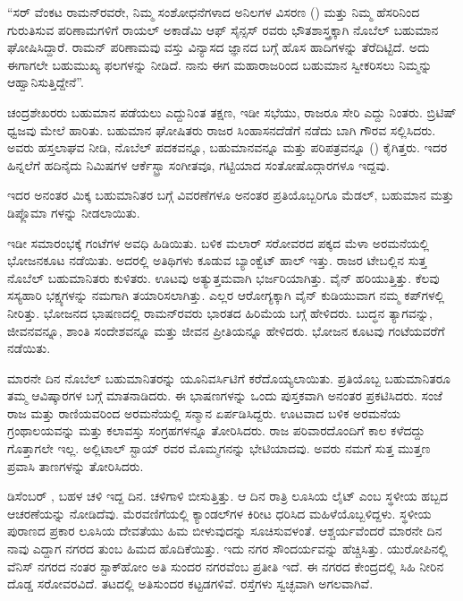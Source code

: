 “ಸರ್ ವೆಂಕಟ ರಾಮನ್‍ರವರೇ, ನಿಮ್ಮ ಸಂಶೋಧನೆಗಳಾದ ಅನಿಲಗಳ ವಿಸರಣ () ಮತ್ತು ನಿಮ್ಮ ಹೆಸರಿನಿಂದ ಗುರುತಿಸುವ ಪರಿಣಾಮಗಳಿಗೆ ರಾಯಲ್ ಅಕಾಡೆಮಿ ಆಫ್ ಸೈನ್ಸಸ್ ರವರು ಭೌತಶಾಸ್ತ್ರಕ್ಕಾಗಿ ನೊಬೆಲ್ ಬಹುಮಾನ ಘೋಷಿಸಿದ್ದಾರೆ. ರಾಮನ್ ಪರಿಣಾಮವು ವಸ್ತು ವಿನ್ಯಾಸದ ಜ್ಞಾನದ ಬಗ್ಗೆ ಹೊಸ ಹಾದಿಗಳನ್ನು ತೆರೆದಿಟ್ಟಿದೆ. ಅದು ಈಗಾಗಲೇ ಬಹುಮುಖ್ಯ ಫಲಗಳನ್ನು ನೀಡಿದೆ. ನಾನು ಈಗ ಮಹಾರಾಜರಿಂದ ಬಹುಮಾನ ಸ್ವೀಕರಿಸಲು ನಿಮ್ಮನ್ನು ಆಹ್ವಾನಿಸುತ್ತಿದ್ದೇನೆ”.

ಚಂದ್ರಶೇಖರರು ಬಹುಮಾನ ಪಡೆಯಲು ಎದ್ದುನಿಂತ ತಕ್ಷಣ, ಇಡೀ ಸಭೆಯು, ರಾಜರೂ ಸೇರಿ ಎದ್ದು ನಿಂತರು. ಬ್ರಿಟಿಷ್ ಧ್ವಜವು ಮೇಲೆ ಹಾರಿತು. ಬಹುಮಾನ ಘೋಷಿತರು ರಾಜರ ಸಿಂಹಾಸನದೆಡೆಗೆ ನಡೆದು ಬಾಗಿ ಗೌರವ ಸಲ್ಲಿಸಿದರು. ಅವರು ಹಸ್ತಲಾಘವ ನೀಡಿ, ನೊಬೆಲ್ ಪದಕವನ್ನೂ, ಬಹುಮಾನವನ್ನೂ ಮತ್ತು ಪರಿಪತ್ರವನ್ನೂ () ಕೈಗಿತ್ತರು. ಇದರ ಹಿನ್ನಲೆಗೆ ಹದಿನೈದು ನಿಮಿಷಗಳ ಆರ್ಕೆಸ್ಟ್ರಾ ಸಂಗೀತವೂ, ಗಟ್ಟಿಯಾದ ಸಂತೋಷೊದ್ಗಾರಗಳೂ ಇದ್ದವು.

ಇದರ ಅನಂತರ ಮಿಕ್ಕ ಬಹುಮಾನಿತರ ಬಗ್ಗೆ ವಿವರಣೆಗಳೂ ಅನಂತರ ಪ್ರತಿಯೊಬ್ಬರಿಗೂ ಮೆಡಲ್, ಬಹುಮಾನ ಮತ್ತು ಡಿಪ್ಲೊಮಾ ಗಳನ್ನು ನೀಡಲಾಯಿತು.

ಇಡೀ ಸಮಾರಂಭಕ್ಕೆ  ಗಂಟೆಗಳ ಅವಧಿ ಹಿಡಿಯಿತು. ಬಳಿಕ ಮಲಾರ್ ಸರೋವರದ ಪಕ್ಕದ ಮೆಳಾ ಅರಮನೆಯಲ್ಲಿ ಭೋಜನಕೂಟ ನಡೆಯಿತು. ಅದರಲ್ಲಿ  ಅತಿಥಿಗಳು ಕೂಡುವ ಬ್ಯಾಂಕ್ವೆಟ್ ಹಾಲ್ ಇತ್ತು. ರಾಜರ ಟೇಬಲ್ಲಿನ ಸುತ್ತ ನೊಬೆಲ್ ಬಹುಮಾನಿತರು ಕುಳಿತರು. ಊಟವು ಅತ್ಯುತ್ತಮವಾಗಿ ಭರ್ಜರಿಯಾಗಿತ್ತು. ವೈನ್ ಹರಿಯುತ್ತಿತ್ತು. ಕೆಲವು ಸಸ್ಯಹಾರಿ ಭಕ್ಷ್ಯಗಳನ್ನು ನಮಗಾಗಿ ತಯಾರಿಸಲಾಗಿತ್ತು. ಎಲ್ಲರ ಆರೋಗ್ಯಕ್ಕಾಗಿ ವೈನ್ ಕುಡಿಯುವಾಗ ನಮ್ಮ ಕಪ್‍ಗಳಲ್ಲಿ ನೀರಿತ್ತು. ಭೋಜನದ ಭಾಷಣದಲ್ಲಿ ರಾಮನ್‍ರವರು ಭಾರತದ ಹಿರಿಮೆಯ ಬಗ್ಗೆ ಹೇಳಿದರು. ಬುದ್ಧನ ತ್ಯಾಗವನ್ನು, ಜೀವನವನ್ನೂ, ಶಾಂತಿ ಸಂದೇಶವನ್ನೂ ಮತ್ತು ಜೀವನ ಪ್ರೀತಿಯನ್ನೂ ಹೇಳಿದರು. ಭೋಜನ ಕೂಟವು  ಗಂಟೆಯವರೆಗೆ ನಡೆಯಿತು.

ಮಾರನೇ ದಿನ ನೊಬೆಲ್ ಬಹುಮಾನಿತರನ್ನು ಯೂನಿವರ್ಸಿಟಿಗೆ ಕರೆದೊಯ್ಯಲಾಯಿತು. ಪ್ರತಿಯೊಬ್ಬ ಬಹುಮಾನಿತರೂ ತಮ್ಮ ಆವಿಷ್ಕಾರಗಳ ಬಗ್ಗೆ ಮಾತನಾಡಿದರು. ಈ ಭಾಷಣಗಳನ್ನು ಒಂದು ಪುಸ್ತಕವಾಗಿ ಅನಂತರ ಪ್ರಕಟಿಸಿದರು. ಸಂಜೆ ರಾಜ ಮತ್ತು ರಾಣಿಯವರಿಂದ ಅರಮನೆಯಲ್ಲಿ ಸನ್ಮಾನ ಏರ್ಪಡಿಸಿದ್ದರು. ಊಟವಾದ ಬಳಿಕ ಅರಮನೆಯ ಗ್ರಂಥಾಲಯವನ್ನು ಮತ್ತು ಕಲಾವಸ್ತು ಸಂಗ್ರಹಗಳನ್ನೂ ತೋರಿಸಿದರು. ರಾಜ ಪರಿವಾರದೊಂದಿಗೆ ಕಾಲ ಕಳೆದದ್ದು ಗೊತ್ತಾಗಲೇ ಇಲ್ಲ. ಅಲ್ಲಿ\break ಟಾಲ್ ಸ್ಟಾಯ್ ರವರ ಮೊಮ್ಮಗನನ್ನು ಭೇಟಿಯಾದವು. ಅವರು ನಮಗೆ ಸುತ್ತ ಮುತ್ತಣ ಪ್ರವಾಸಿ ತಾಣಗಳನ್ನು ತೋರಿಸಿದರು.

ಡಿಸೆಂಬರ್ , ಬಹಳ ಚಳಿ ಇದ್ದ ದಿನ. ಚಳಿಗಾಳಿ ಬೀಸುತ್ತಿತ್ತು. ಆ ದಿನ ರಾತ್ರಿ ಲೂಸಿಯ ಲೈಟ್ ಎಂಬ ಸ್ಥಳೀಯ ಹಬ್ಬದ ಆಚರಣೆಯನ್ನು ನೋಡಿದೆವು. ಮೆರವಣಿಗೆಯಲ್ಲಿ ಕ್ಯಾಂಡಲ್‍ಗಳ ಕಿರೀಟ ಧರಿಸಿದ ಮಹಿಳೆಯೊಬ್ಬಳಿದ್ದಳು. ಸ್ಥಳೀಯ ಪುರಾಣದ ಪ್ರಕಾರ ಲೂಸಿಯ ದೇವತೆಯು ಹಿಮ ಬೀಳುವುದನ್ನು ಸೂಚಿಸುವಳಂತೆ. ಆಶ್ಚರ್ಯವೆಂದರೆ ಮಾರನೇ ದಿನ ನಾವು ಎದ್ದಾಗ ನಗರದ ತುಂಬ ಹಿಮದ ಹೊದಿಕೆಯಿತ್ತು. ಇದು ನಗರ ಸೌಂದರ್ಯವನ್ನು ಹೆಚ್ಚಿಸಿತ್ತು. ಯುರೋಪಿನಲ್ಲಿ ವೆನಿಸ್ ನಗರದ ನಂತರ ಸ್ಟಾಕ್‍ಹೋಂ ಅತಿ ಸುಂದರ ನಗರವೆಂಬ ಪ್ರತೀತಿ ಇದೆ. ಈ ನಗರದ ಕೇಂದ್ರದಲ್ಲಿ ಸಿಹಿ ನೀರಿನ ದೊಡ್ಡ ಸರೋವರವಿದೆ. ತಟದಲ್ಲಿ ಅತಿಸುಂದರ ಕಟ್ಟಡಗಳಿವೆ. ರಸ್ತೆಗಳು ಸ್ವಚ್ಛವಾಗಿ ಅಗಲವಾಗಿವೆ.

